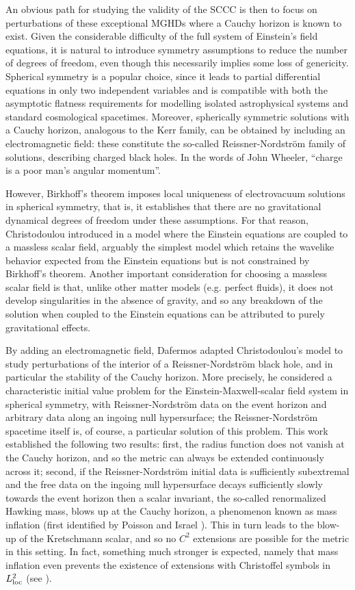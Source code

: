 \documentclass[a4paper,11pt,oneside,reqno]{amsart}
\begin{document}
An obvious path for studying the validity of the SCCC is then to focus on perturbations of these exceptional MGHDs where a Cauchy horizon is known to exist. Given the considerable difficulty of the full system of Einstein's field equations, it is natural to introduce symmetry assumptions to reduce the number of degrees of freedom, even though this necessarily implies some loss of genericity. Spherical symmetry is a popular choice, since it leads to partial differential equations in only two independent variables and is compatible with both the asymptotic flatness requirements for modelling isolated astrophysical systems and standard cosmological spacetimes. Moreover, spherically symmetric solutions with a Cauchy horizon, analogous to the Kerr family, can be obtained by including an electromagnetic field: these constitute the so-called Reissner-Nordstr\"{o}m family of solutions, describing charged black holes. In the words of John Wheeler, ``charge is a poor man's angular momentum''.

However, Birkhoff's theorem imposes local uniqueness of electrovacuum solutions in spherical symmetry, that is, it establishes that there are no gravitational dynamical degrees of freedom under these assumptions. For that reason, Christodoulou introduced in \cite{Christodoulou:1986} a model where the Einstein equations are coupled to a massless scalar field, arguably the simplest model which retains the wavelike behavior expected from the Einstein equations but is not constrained by Birkhoff's theorem. Another important consideration for choosing  a massless scalar field is that, unlike other matter models (e.g. perfect fluids), it does not develop singularities in the absence of gravity, and so any breakdown of the solution when coupled to the Einstein equations can be attributed to purely gravitational effects. 

By adding an electromagnetic field, Dafermos \cite{Dafermos1} adapted Christodoulou's model to study perturbations of the interior of a Reissner-Nordstr\"{o}m black hole, and in particular the stability of the Cauchy horizon. More precisely, he considered a characteristic initial value problem for the Einstein-Maxwell-scalar field system in spherical symmetry, with Reissner-Nordstr\"{o}m data on the event horizon and arbitrary data along an ingoing null hypersurface; the Reissner-Nordstr\"{o}m spacetime itself is, of course, a particular solution of this problem. This work established the following two results: first, the radius function does not vanish at the Cauchy horizon, and so the metric can always be extended continuously across it; second, if the Reissner-Nordstr\"{o}m initial data is sufficiently subextremal and the free data on the ingoing null hypersurface decays sufficiently slowly towards the event horizon then a scalar invariant, the so-called renormalized Hawking mass, blows up at the Cauchy horizon, a phenomenon known as mass inflation (first identified by Poisson and Israel \cite{IsraelPoisson}). This in turn leads to the blow-up of the Kretschmann scalar, and so no $C^2$ extensions are possible for the metric in this setting. In fact, something much stronger is expected, namely that mass inflation even prevents the existence of extensions with Christoffel symbols in $L^2_{{\rm loc}}$ (see \cite{DafermosBlack}).
\end{document}
